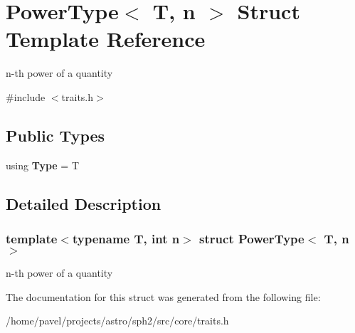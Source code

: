 \hypertarget{structPowerType}{}\section{Power\+Type$<$ T, n $>$ Struct Template Reference}
\label{structPowerType}


n-\/th power of a quantity  




{\ttfamily \#include $<$traits.\+h$>$}

\subsection*{Public Types}
\begin{DoxyCompactItemize}
\item 
\hypertarget{structPowerType_a4624d6c33f7b9ede7292a0d3aa04f1f4}{}\label{structPowerType_a4624d6c33f7b9ede7292a0d3aa04f1f4} 
using {\bfseries Type} = T
\end{DoxyCompactItemize}


\subsection{Detailed Description}
\subsubsection*{template$<$typename T, int n$>$\newline
struct Power\+Type$<$ T, n $>$}

n-\/th power of a quantity 

The documentation for this struct was generated from the following file\+:\begin{DoxyCompactItemize}
\item 
/home/pavel/projects/astro/sph2/src/core/traits.\+h\end{DoxyCompactItemize}
